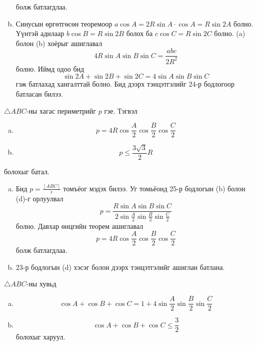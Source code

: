 \documentclass[10pt,a4paper,oneside]{book}
\begin{document}
\begin{enumerate}[(a)]
\begin{equation*}
\end{equation*}
болж батлагдлаа.
\item
Синусын өргөтгөсөн теоремоор  $a\cos A = 2R\sin A\cdot\cos A = R\sin 2A$ болно. Үүнтэй адилаар $b\cos B = R\sin 2B$ болох ба $c\cos C = R\sin 2C$ болно.
(a) болон (b) хоёрыг ашиглавал
\begin{equation*}
4R\sin A\sin B\sin C = \frac{abc}{2R^2}
\end{equation*}
болно. Иймд одоо бид 
\begin{equation*}
\sin 2A + \sin 2B + \sin 2C = 4\sin A\sin B\sin C
\end{equation*}
 гэж батлахад хангалттай болно. Бид дээрх тэнцэтгэлийг 24-р бодлогоор батласан билээ.
\end{enumerate}

\Problem
$\triangle ABC$-ны хагас периметрийг $p$ гэе. Тэгвэл
\begin{enumerate}[(a)]
\item
\begin{equation*}
p=4R\cos\frac{A}{2}\cos\frac{B}{2}\cos\frac{C}{2}
\end{equation*}
\item
\begin{equation*}
p \leq \frac{3\sqrt{3}}{2}R
\end{equation*}
\end{enumerate}
болохыг батал.

\TheSolution
\begin{enumerate}[(a)]
\item
Бид $p = \frac{[ABC]}{r}$ томъёог мэдэх билээ. Уг томьёонд 25-р бодлогын (b) болон (d)-г орлуулвал
\begin{equation*}
p=\frac{R\sin A\sin B\sin C}{2\sin \frac{A}{2}\sin\frac{B}{2}\sin \frac{C}{2}}
\end{equation*}
болно. Давхар өнцгийн теорем ашиглавал
\begin{equation*}
p =4R\cos\frac{A}{2}\cos \frac{B}{2}\cos\frac{C}{2}
\end{equation*}
болж батлагдлаа.
\item
23-р бодлогын (d) хэсэг болон дээрх тэнцэтгэлийг ашиглан батлана.
\end{enumerate}

\Problem
$\triangle ABC$-ны хувьд
\begin{enumerate}[(a)]
\item
\begin{equation*}
\cos A + \cos B + \cos C = 1 + 4\sin \frac{A}{2}\sin \frac{B}{2}\sin \frac{C}{2}
\end{equation*}
\item
\begin{equation*}
\cos A + \cos B + \cos C \leq \frac{3}{2}
\end{equation*}
болохыг харуул.
\end{enumerate}
\end{document}
